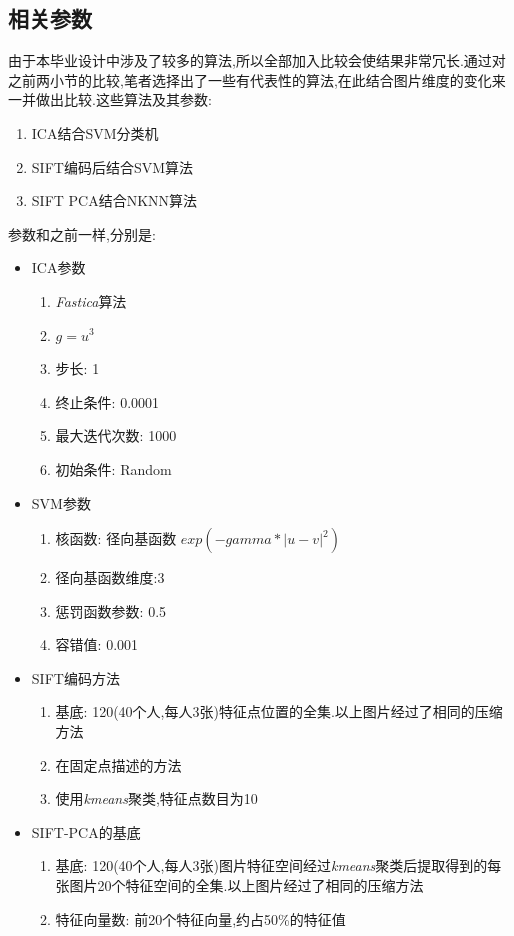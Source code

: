 \subsection{相关参数}
由于本毕业设计中涉及了较多的算法,所以全部加入比较会使结果非常冗长.通过对之前两小节的比较,笔者选择出了一些有代表性的算法,在此结合图片维度的变化来一并做出比较.这些算法及其参数:
\begin{enumerate}
	\item ICA结合SVM分类机
	\item SIFT编码后结合SVM算法
	\item SIFT PCA结合NKNN算法
\end{enumerate}
参数和之前一样,分别是:
\begin{itemize}
		\item ICA参数 \begin{enumerate}
		\item \textit{Fastica}算法
		\item $g = u^3$
		\item 步长: 1
		\item 终止条件: 0.0001
		\item 最大迭代次数: 1000
		\item 初始条件: Random	\end{enumerate}
		
	\item SVM参数 \begin{enumerate}
	\item 核函数: 径向基函数 $exp(-gamma*|u-v|^2)$
		\item 径向基函数维度:3
		\item 惩罚函数参数: 0.5
		\item 容错值: 0.001	\end{enumerate}
	
		\item SIFT编码方法 \begin{enumerate}
\item 基底: 120(40个人,每人3张)特征点位置的全集.以上图片经过了相同的压缩方法
	\item 在固定点描述的方法
	\item 使用\textit{kmeans}聚类,特征点数目为10	\end{enumerate}
	
	\item SIFT-PCA的基底 \begin{enumerate}
	\item 基底: 120(40个人,每人3张)图片特征空间经过\textit{kmeans}聚类后提取得到的每张图片20个特征空间的全集.以上图片经过了相同的压缩方法
	\item 特征向量数: 前20个特征向量,约占50\%的特征值
	\end{enumerate}
	
\end{itemize}
